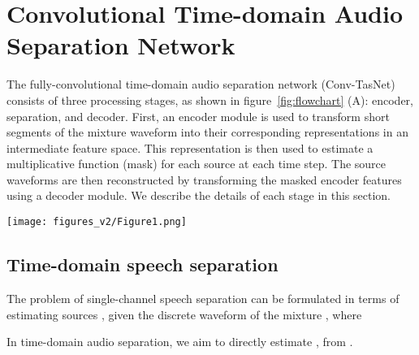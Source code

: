 \documentclass[journal]{IEEEtran}
\begin{document}
\section{Convolutional Time-domain Audio Separation Network}
\label{sec:model}
The fully-convolutional time-domain audio separation network (Conv-TasNet) consists of three processing stages, as shown in figure~\ref{fig:flowchart} (A): encoder, separation, and decoder. First, an encoder module is used to transform short segments of the mixture waveform into their corresponding representations in an intermediate feature space.
This representation is then used to estimate a multiplicative function (mask) for each source at each time step. The source waveforms are then reconstructed by transforming the masked encoder features using a decoder module. We describe the details of each stage in this section.
\begin{figure*}[!htp]
	\small
	\centering
	\texttt{[image: figures\_v2/Figure1.png]}
	\caption{(A): the block diagram of the TasNet system. An encoder maps a segment of the mixture waveform to a high-dimensional representation and a separation module calculates a multiplicative function (i.e., a mask) for each of the target sources. A decoder reconstructs the source waveforms from the masked features. (B): A flowchart of the proposed system. A 1-D convolutional autoencoder models the waveforms and a temporal convolutional network (TCN) separation module estimates the masks based on the encoder output. Different colors in the 1-D convolutional blocks in TCN denote different dilation factors. (C): The design of 1-D convolutional block. Each block consists of a  operation followed by a depthwise convolution () operation, with nonlinear activation function and normalization added between each two convolution operations. Two linear  blocks serve as the residual path and the skip-connection path respectively.}
	\label{fig:flowchart}
\end{figure*}

\subsection{Time-domain speech separation}

The problem of single-channel speech separation can be formulated in terms of estimating  sources , given the discrete waveform of the mixture , where


In time-domain audio separation, we aim to directly estimate , from . 
\end{document}
